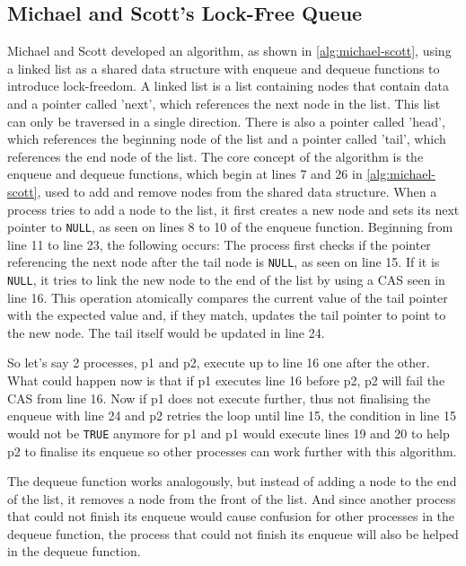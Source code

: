 \subsection{Michael and Scott's Lock-Free Queue}\label{subsec:michael-scott}

Michael and Scott developed an algorithm, as shown in \cref{alg:michael-scott}, using a linked list as a shared data structure with enqueue and dequeue functions to introduce lock-freedom. A linked list is a list containing nodes that contain data and a pointer called 'next', which references the next node in the list. This list can only be traversed in a single direction. There is also a pointer called 'head', which references the beginning node of the list and a pointer called 'tail', which references the end node of the list. The core concept of the algorithm is the enqueue and dequeue functions, which begin at lines 7 and 26 in \cref{alg:michael-scott}, used to add and remove nodes from the shared data structure. When a process tries to add a node to the list, it first creates a new node and sets its next pointer to \texttt{NULL}, as seen on lines 8 to 10 of the enqueue function. Beginning from line 11 to line 23, the following occurs: The process first checks if the pointer referencing the next node after the tail node is \texttt{NULL}, as seen on line 15. If it is \texttt{NULL}, it tries to link the new node to the end of the list by using a \ac{CAS} seen in line 16. This operation atomically compares the current value of the tail pointer with the expected value and, if they match, updates the tail pointer to point to the new node. The tail itself would be updated in line 24.  \cite{MichaelScottQueue}

So let's say 2 processes, p1 and p2, execute up to line 16 one after the other. What could happen now is that if p1 executes line 16 before p2, p2 will fail the \ac{CAS} from line 16. Now if p1 does not execute further, thus not finalising the enqueue with line 24 and p2 retries the loop until line 15, the condition in line 15 would not be \texttt{TRUE} anymore for p1 and p1 would execute lines 19 and 20 to help p2 to finalise its enqueue so other processes can work further with this algorithm. \cite{MichaelScottQueue}

The dequeue function works analogously, but instead of adding a node to the end of the list, it removes a node from the front of the list. And since another process that could not finish its enqueue would cause confusion for other processes in the dequeue function, the process that could not finish its enqueue will also be helped in the dequeue function. \cite{MichaelScottQueue}

